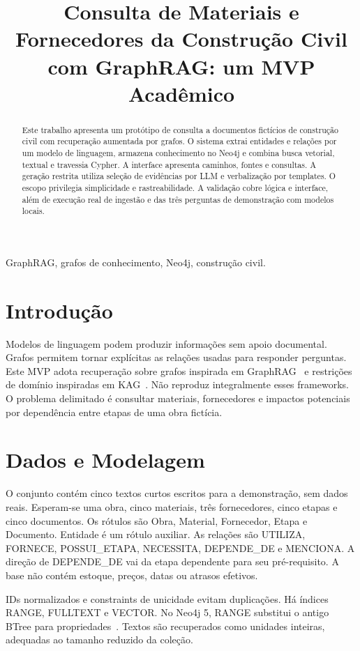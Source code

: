 \documentclass[conference]{IEEEtran}
\title{Consulta de Materiais e Fornecedores da Construção Civil com GraphRAG: um MVP Acadêmico}
\author{\IEEEauthorblockN{Preencher nomes dos integrantes}
\IEEEauthorblockA{Preencher instituição e curso\\Tendências em Ciência da Computação}}
\begin{document}
\maketitle
\begin{abstract}
Este trabalho apresenta um protótipo de consulta a documentos fictícios de construção civil com recuperação aumentada por grafos. O sistema extrai entidades e relações por um modelo de linguagem, armazena conhecimento no Neo4j e combina busca vetorial, textual e travessia Cypher. A interface apresenta caminhos, fontes e consultas. A geração restrita utiliza seleção de evidências por LLM e verbalização por templates. O escopo privilegia simplicidade e rastreabilidade. A validação cobre lógica e interface, além de execução real de ingestão e das três perguntas de demonstração com modelos locais.
\end{abstract}
\begin{IEEEkeywords}
GraphRAG, grafos de conhecimento, Neo4j, construção civil.
\end{IEEEkeywords}

\section{Introdução}
Modelos de linguagem podem produzir informações sem apoio documental. Grafos permitem tornar explícitas as relações usadas para responder perguntas. Este MVP adota recuperação sobre grafos inspirada em GraphRAG~\cite{graphrag} e restrições de domínio inspiradas em KAG~\cite{kag}. Não reproduz integralmente esses frameworks. O problema delimitado é consultar materiais, fornecedores e impactos potenciais por dependência entre etapas de uma obra fictícia.

\section{Dados e Modelagem}
O conjunto contém cinco textos curtos escritos para a demonstração, sem dados reais. Esperam-se uma obra, cinco materiais, três fornecedores, cinco etapas e cinco documentos. Os rótulos são Obra, Material, Fornecedor, Etapa e Documento. Entidade é um rótulo auxiliar. As relações são UTILIZA, FORNECE, POSSUI\_ETAPA, NECESSITA, DEPENDE\_DE e MENCIONA. A direção de DEPENDE\_DE vai da etapa dependente para seu pré-requisito. A base não contém estoque, preços, datas ou atrasos efetivos.

IDs normalizados e constraints de unicidade evitam duplicações. Há índices RANGE, FULLTEXT e VECTOR. No Neo4j 5, RANGE substitui o antigo BTree para propriedades~\cite{migration}. Textos são recuperados como unidades inteiras, adequadas ao tamanho reduzido da coleção.
\end{document}
